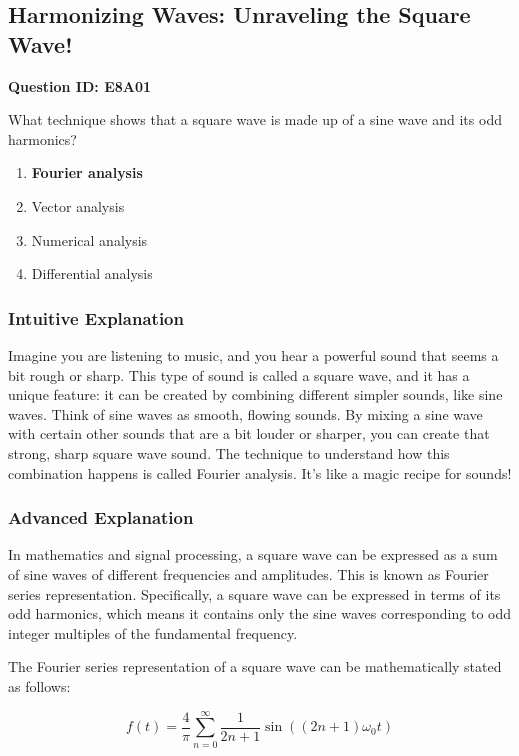 \subsection{Harmonizing Waves: Unraveling the Square Wave!}

\begin{tcolorbox}
\textbf{Question ID: E8A01} 

What technique shows that a square wave is made up of a sine wave and its odd harmonics?

\begin{enumerate}[label=\Alph*.]
    \item \textbf{Fourier analysis}
    \item Vector analysis
    \item Numerical analysis
    \item Differential analysis
\end{enumerate}
\end{tcolorbox}

\subsubsection{Intuitive Explanation}
Imagine you are listening to music, and you hear a powerful sound that seems a bit rough or sharp. This type of sound is called a square wave, and it has a unique feature: it can be created by combining different simpler sounds, like sine waves. Think of sine waves as smooth, flowing sounds. By mixing a sine wave with certain other sounds that are a bit louder or sharper, you can create that strong, sharp square wave sound. The technique to understand how this combination happens is called Fourier analysis. It's like a magic recipe for sounds!

\subsubsection{Advanced Explanation}
In mathematics and signal processing, a square wave can be expressed as a sum of sine waves of different frequencies and amplitudes. This is known as Fourier series representation. Specifically, a square wave can be expressed in terms of its odd harmonics, which means it contains only the sine waves corresponding to odd integer multiples of the fundamental frequency.

The Fourier series representation of a square wave can be mathematically stated as follows:

\[
f(t) = \frac{4}{\pi} \sum_{n=0}^{\infty} \frac{1}{2n+1} \sin((2n+1) \omega_0 t)
\]

